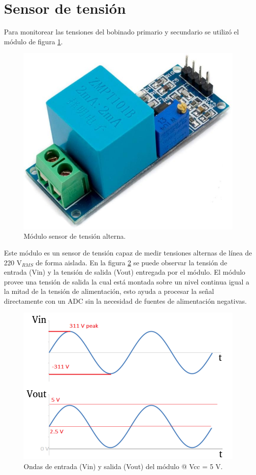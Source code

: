 \section{Sensor de tensión}
\label{sec:secZMPT101B}

Para monitorear las tensiones del bobinado primario y secundario se utilizó el módulo de figura \ref{fig:ZMPT101B}.

\begin{figure}[htpb]
	\centering
	\includegraphics[scale=.3]{./Figures/zmpt101b.jpg}
	\caption{Módulo sensor de tensión alterna.}
	\label{fig:ZMPT101B}
\end{figure}

Este módulo es un sensor de tensión capaz de medir tensiones alternas de línea de 220 V$_{RMS}$ de forma aislada. En la figura \ref{fig:ZMPT101B_waves} se puede observar la tensión de entrada (Vin) y la tensión de salida (Vout) entregada por el módulo. El módulo provee una tensión de salida la cual está montada sobre un nivel continua igual a la mitad de la tensión de alimentación, esto ayuda a procesar la señal directamente con un ADC sin la necesidad de fuentes de alimentación negativas.

\begin{figure}[htpb]
	\centering
	\includegraphics[scale=1.2]{./Figures/ZMPT101B_waves.png}
	\caption{Ondas de entrada (Vin) y salida (Vout) del módulo @ Vcc = 5 V.}
	\label{fig:ZMPT101B_waves}
\end{figure}

